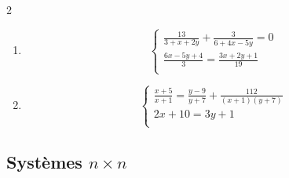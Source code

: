 \begin{exercice}
\begin{multicols}{2}
\begin{enumerate}
$$\begin{array} {l}
    \frac{3x}{5}+\frac{4y}{10}=\frac{x-y}{5} \\ 
   \frac{10(2x+3)}{11}-2\left( y-\frac{3x-5}{8} \right)=60 \\ 
\end{array} \right.$$
\item $$\left\{ \begin{array} {l}
    \frac{13}{3+x+2y}+\frac{3}{6+4x-5y}=0 \\ 
   \frac{6x-5y+4}{3}=\frac{3x+2y+1}{19} \\ 
\end{array} \right.$$
\item $$\left\{ \begin{array} {l}
    \frac{x+5}{x+1}=\frac{y-9}{y+7}+\frac{112}{(x+1)(y+7)} \\ 
   2x+10=3y+1 \\ 
\end{array} \right.$$
\end{enumerate}
\end{multicols}
\end{exercice}

\subsection{Systèmes $n\times n$}

